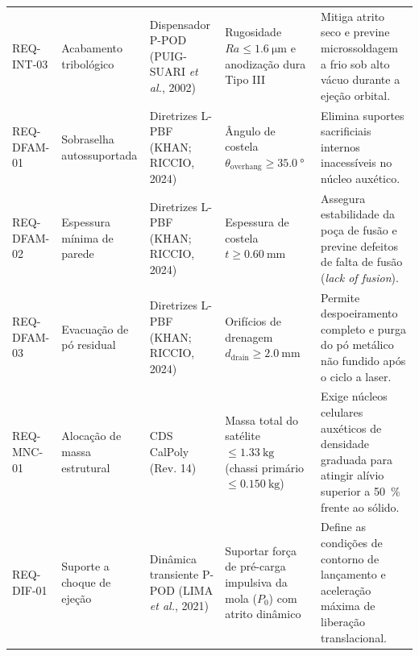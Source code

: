 \begin{table}[htb]
\begin{tabularx}{\textwidth}{@{}>{\raggedright\arraybackslash}p{1.6cm} >{\raggedright\arraybackslash}p{2.2cm} >{\raggedright\arraybackslash}p{2.4cm} >{\raggedright\arraybackslash}p{3.0cm} >{\raggedright\arraybackslash}X@{}}
    REQ-INT-03 & Acabamento tribológico & Dispensador P-POD (PUIG-SUARI \textit{et al.}, 2002) & Rugosidade $Ra \le \SI{1.6}{\micro\metre}$ e anodização dura Tipo III & Mitiga atrito seco e previne microssoldagem a frio sob alto vácuo durante a ejeção orbital. \\[4pt]
    REQ-DFAM-01 & Sobraselha autossuportada & Diretrizes L-PBF (KHAN; RICCIO, 2024) & Ângulo de costela $\theta_{\text{overhang}} \ge \SI{35.0}{\degree}$ & Elimina suportes sacrificiais internos inacessíveis no núcleo auxético. \\[4pt]
    REQ-DFAM-02 & Espessura mínima de parede & Diretrizes L-PBF (KHAN; RICCIO, 2024) & Espessura de costela $t \ge \SI{0.60}{\milli\metre}$ & Assegura estabilidade da poça de fusão e previne defeitos de falta de fusão (\textit{lack of fusion}). \\[4pt]
    REQ-DFAM-03 & Evacuação de pó residual & Diretrizes L-PBF (KHAN; RICCIO, 2024) & Orifícios de drenagem $d_{\text{drain}} \ge \SI{2.0}{\milli\metre}$ & Permite despoeiramento completo e purga do pó metálico não fundido após o ciclo a laser. \\[4pt]
    REQ-MNC-01 & Alocação de massa estrutural & CDS CalPoly (Rev. 14) & Massa total do satélite $\le \SI{1.33}{\kilo\gram}$ (chassi primário $\le \SI{0.150}{\kilo\gram}$) & Exige núcleos celulares auxéticos de densidade graduada para atingir alívio superior a \SI{50}{\percent} frente ao sólido. \\[4pt]
    REQ-DIF-01 & Suporte a choque de ejeção & Dinâmica transiente P-POD (LIMA \textit{et al.}, 2021) & Suportar força de pré-carga impulsiva da mola ($P_0$) com atrito dinâmico & Define as condições de contorno de lançamento e aceleração máxima de liberação translacional. \\
    \bottomrule
  \end{tabularx}
\end{table}
